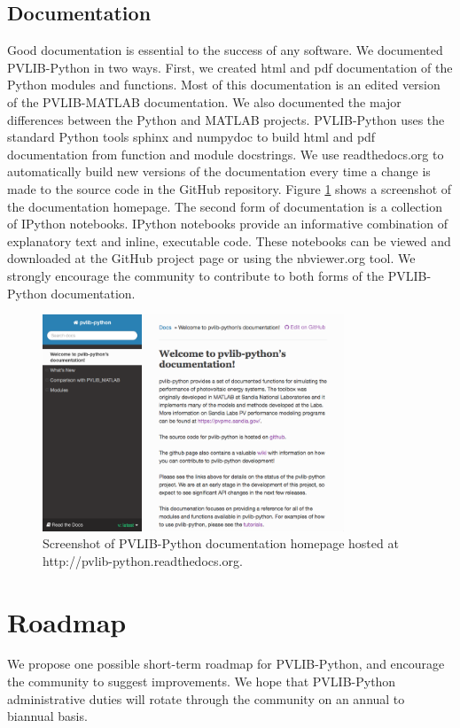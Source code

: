 \documentclass[conference]{IEEEtran}
\begin{document}
\subsection{Documentation}
Good documentation is essential to the success of any software.
We documented PVLIB-Python in two ways.
First, we created html and pdf documentation of the Python modules and functions.
Most of this documentation is an edited version of the PVLIB-MATLAB documentation.
We also documented the major differences between the Python and MATLAB projects.
PVLIB-Python uses the standard Python tools sphinx and numpydoc to build html and pdf documentation from function and module docstrings.
We use readthedocs.org to automatically build new versions of the documentation every time a change is made to the source code in the GitHub repository.
Figure \ref{rtd} shows a screenshot of the documentation homepage.
The second form of documentation is a collection of IPython notebooks.
IPython notebooks provide an informative combination of explanatory text and inline, executable code.
These notebooks can be viewed and downloaded at the GitHub project page or using the nbviewer.org tool. 
We strongly encourage the community to contribute to both forms of the PVLIB-Python documentation.
\begin{figure}
\includegraphics[width=9cm]{rtd.png}
\caption{\label{rtd}Screenshot of PVLIB-Python documentation homepage hosted at http://pvlib-python.readthedocs.org.}
\end{figure}


\section{Roadmap}

We propose one possible short-term roadmap for PVLIB-Python, and encourage the community to suggest improvements.
We hope that PVLIB-Python administrative duties will rotate through the community on an annual to biannual basis.
\end{document}
